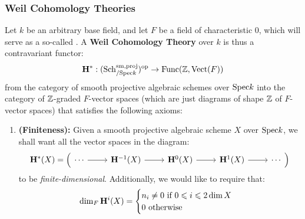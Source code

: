             \subsubsection{Weil Cohomology Theories}    
                \begin{definition} \label{def: weil_cohomology_theories}
                    Let $k$ be an arbitrary base field, and let $F$ be a field of characteristic $0$, which will serve as a so-called . A \textbf{Weil Cohomology Theory} over $k$ is thus a contravariant functor:
                        $$\mathbf{H}^*: (\mathrm{Sch}_{/\mathrm{Spec} k}^{\mathrm{sm}, \mathrm{proj}})^{\mathrm{op}} \to \mathrm{Func}(\mathbb{Z}, \mathrm{Vect}(F))$$
                    from the category of smooth projective algebraic schemes over $\mathrm{Spec} k$ into the category of $\mathbb{Z}$-graded $F$-vector spaces (which are just diagrams of shape $\mathbb{Z}$ of $F$-vector spaces) that satisfies the following axioms:
                        \begin{enumerate}
                            \item \textbf{(Finiteness):} Given a smooth projective algebraic scheme $X$ over $\mathrm{Spec} k$, we shall want all the vector spaces in the diagram:
                                $$
                                    \H^*(X) =
                                    \left(
                                        \begin{tikzcd}
                                        	\cdots & {\H^{-1}(X)} & {\H^0(X)} & {\H^1(X)} & \cdots
                                        	\arrow[from=1-2, to=1-3]
                                        	\arrow[from=1-3, to=1-4]
                                        	\arrow[from=1-4, to=1-5]
                                        	\arrow[from=1-1, to=1-2]
                                        \end{tikzcd}
                                    \right)
                                $$
                            to be \textit{finite-dimensional}. Additionally, we would like to require that:
                                $$
                                    \dim_F \mathbf{H}^i(X) = 
                                    \begin{cases}
                                        \text{$n_i \not = 0$ if $0 \leqslant i \leqslant 2\dim X$}
                                        \\
                                        \text{$0$ otherwise}
                                    \end{cases}
                                $$

\end{enumerate}
\end{definition}
